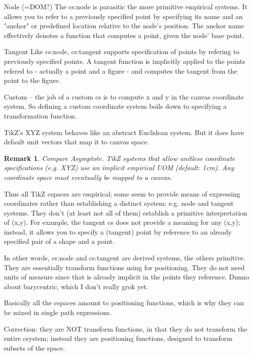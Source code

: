 \documentclass[12pt]{tufte-handout}
\numberwithin{equation}{subsection}
\numberwithin{equation}{subsection}
\newtheorem{remark}{Remark}
\newcommand\cspace{coordinate space}
\begin{document}
\begin{appendices}
    Node (=DOM?)  The cs:node is parasitic the more primitive empirical
    systems.  It allows you to refer to a previously specified point by
    specifying its name and an "anchor" or predefined location relative to
    the node's position.  The anchor name effectively denotes a function
    that computes a point, given the node' base point.

    Tangent Like cs:node, cs:tangent supports specification of points by
    refering to previously specified points.  A tangent function is
    implicitly applied to the points refered to - actually a point and a
    figure - and computes the tangent from the point to the figure.

    Custom -- the job of a custom cs is to compute x and y in the canvas
    coordinate system.  So defining a custom coordinate system boils down
    to specifying a transformation function.

    TikZ's XYZ system behaves like an abstract Euclidean system.  But it
    does have default unit vectors that map it to canvas space.

    \begin{remark}
      Compare Asymptote.  TikZ systems that allow unitless coordinate
      specifications (e.g. XYZ) use an implicit empirical UOM (default:
      1cm).  Any \cspace{} must eventually be mapped to a canvas.
    \end{remark}

    Thus all TikZ cspaces are empirical; some seem to provide means of
    expressing coordinates rather than establishing a distinct system;
    e.g. node and tangent systems.  They don't (at least not all of them)
    establish a primitive interpretation of (x,y).  For example, the
    tangent cs does not provide a meaning for any (x,y); instead, it
    allows you to specify a (tangent) point by reference to an already
    specified pair of a shape and a point.

    In other words, cs:node and cs:tangent are derived systems, the others
    primitive.  They are essentially transform functions using for
    positioning.  They do not need units of measure since that is already
    implicit in the points they reference.  Dunno about barycentric, which
    I don't really grok yet.

    Basically all the cspaces amount to positioning functions, which is
    why they can be mixed in single path expressions.

    Correction: they are NOT transform functions, in that they do not
    transform the entire csystem; instead they are positioning functions,
    designed to transform subsets of the space.


\end{appendices}
\end{document}
